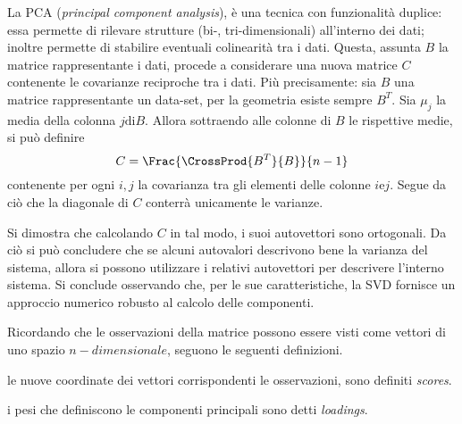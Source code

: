 \documentclass{subfiles}
\begin{document}
La PCA (\emph{principal component analysis}), è una tecnica con funzionalità duplice:
essa permette di rilevare strutture (bi-, tri-dimensionali) all'interno dei dati; inoltre permette di stabilire eventuali colinearità tra i dati.
Questa, assunta \(B\) la matrice rappresentante i dati, procede a considerare una nuova matrice \(C\) contenente le covarianze reciproche tra i dati.
Più precisamente: sia \(B\) una matrice rappresentante un data-set, per la geometria esiste sempre \(B^{T}\).
Sia \(\mu_{j}\) la media della colonna \(j \text{di} B\). Allora sottraendo alle colonne di \(B\) le rispettive medie,
si può definire
\[
    C = \Frac{\CrossProd{B^{T}}{B}}{n - 1}
\]
contenente per ogni \(i, j\) la covarianza tra gli elementi delle colonne \(i \text{e} j\).
Segue da ciò che la diagonale di \(C\) conterrà unicamente le varianze.

Si dimostra che calcolando \(C\) in tal modo, i suoi autovettori sono ortogonali.
Da ciò si può concludere che se alcuni autovalori descrivono bene la varianza del sistema,
allora si possono utilizzare i relativi autovettori per descrivere l'interno sistema.
Si conclude osservando che, per le sue caratteristiche, la SVD fornisce un approccio numerico robusto al calcolo delle componenti.

Ricordando che le osservazioni della matrice possono essere visti come vettori di uno spazio $n-dimensionale$, seguono le seguenti definizioni.
\begin{Definition*}
    le nuove coordinate dei vettori corrispondenti le osservazioni, sono definiti \emph{scores}.
\end{Definition*}
\begin{Definition*}
    i pesi che definiscono le componenti principali sono detti \emph{loadings}.
\end{Definition*}
\end{document}
